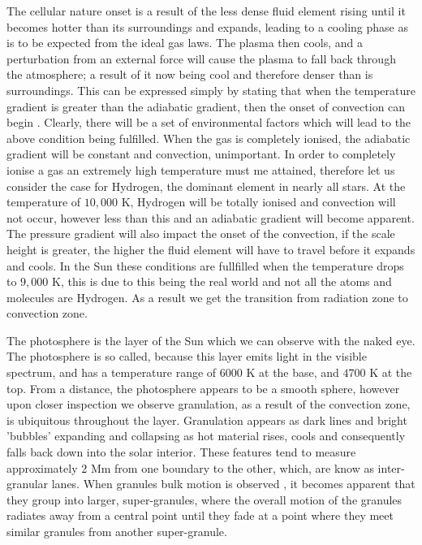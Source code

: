 The cellular nature onset is a result of the less dense fluid element rising until it becomes hotter than its surroundings and expands, leading to a cooling phase as is to be expected from the ideal gas laws.
The plasma then cools, and a perturbation from an external force will cause the plasma to fall back through the atmosphere; a result of it now being cool and therefore denser than is surroundings.
This can be expressed simply by stating that when the temperature gradient is greater than the adiabatic gradient, then the onset of convection can begin \cite{Hansen2004}.
Clearly, there will be a set of environmental factors which will lead to the above condition being fulfilled.
When the gas is completely ionised, the adiabatic gradient will be constant and convection, unimportant.
In order to completely ionise a gas an extremely high temperature must me attained, therefore let us consider the case for Hydrogen, the dominant element in nearly all stars.
At the temperature of $10,000$ K, Hydrogen will be totally ionised and convection will not occur, however less than this and an adiabatic gradient will become apparent.
The pressure gradient will also impact the onset of the convection, if the scale height is greater, the higher the fluid element will have to travel before it expands and cools.
In the Sun these conditions are fullfilled when the temperature drops to $9,000$ K, this is due to this being the real world and not all the atoms and molecules are Hydrogen.
As a result we get the transition from radiation zone to convection zone.

The photosphere is the layer of the Sun which we can observe with the naked eye.
The photosphere is so called, because this layer emits light in the visible spectrum, and has a temperature range of $6000$ K at the base, and $4700$ K at the top. 
From a distance, the photosphere appears to be a smooth sphere, however upon closer inspection we observe granulation, as a result of the convection zone, is ubiquitous throughout the layer.
Granulation appears as dark lines and bright 'bubbles' expanding and collapsing as hot material rises, cools and consequently falls back down into the solar interior.
These features tend to measure approximately $2$ Mm from one boundary to the other, which, are know as inter-granular lanes.
When granules bulk motion is observed , it becomes apparent that they group into larger, super-granules, where the overall motion of the granules radiates away from a central point until they fade at a point where they meet similar granules from another super-granule.

